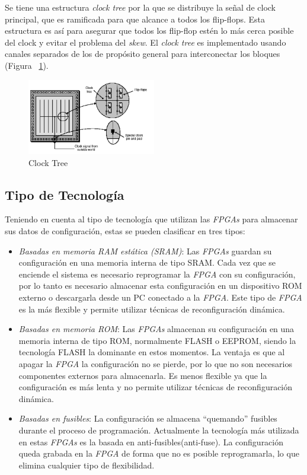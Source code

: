 		Se tiene  una estructura \textit{clock tree} por la que se distribuye la señal de clock principal, que es ramificada para
		que alcance a todos los flip-flops. Esta estructura es así para asegurar que todos los flip-flop estén lo más cerca posible del clock y evitar el
		problema del \textit{skew}. El \textit{clock tree} es implementado usando canales separados de los de propósito general para interconectar los
		bloques (Figura ~\ref{fig:ctree}).

		\begin{figure}[h!]
 		\begin{center}
 		\includegraphics[width=0.5\textwidth,keepaspectratio=true]{./images/clocktree}
  		\caption{Clock Tree}
  		\label{fig:ctree}
 		\end{center}
		\end{figure}

	\subsection{Tipo de Tecnología} 
	Teniendo en cuenta al tipo de tecnología que utilizan las \textit{FPGAs} para almacenar sus datos de configuración, estas se pueden clasificar en
	tres tipos:

	\begin {itemize}
	\item  
	\textit {Basadas en memoria RAM estática (SRAM)}: Las \textit{FPGAs} guardan su configuración en una memoria interna de tipo SRAM. Cada vez que se
	enciende el sistema es necesario reprogramar la \textit{FPGA} con su configuración, por lo tanto es necesario almacenar esta configuración en un
	dispositivo ROM externo o descargarla desde un PC conectado a la \textit{FPGA}. Este tipo de \textit{FPGA} es la más flexible y permite utilizar
	técnicas de reconfiguración dinámica.
	\item  
	\textit{Basadas en memoria ROM}: Las \textit{FPGAs} almacenan su configuración en una memoria interna de tipo ROM, normalmente FLASH o EEPROM, siendo
	la tecnología FLASH la dominante en estos momentos. La ventaja es que al apagar la \textit{FPGA} la configuración no se pierde, por lo que no son
	necesarios componentes externos para almacenarla. Es menos flexible ya que la configuración es más lenta y no permite utilizar técnicas de
	reconfiguración dinámica.
	\item  
	\textit{Basadas en fusibles}: La configuración se almacena “quemando” fusibles durante el proceso de programación. Actualmente la tecnología más
	utilizada en estas \textit{FPGAs} es la basada en anti-fusibles(anti-fuse). La configuración queda grabada en la \textit{FPGA} de forma que no es
	posible reprogramarla, lo que elimina cualquier tipo de flexibilidad.
 	\end {itemize}

